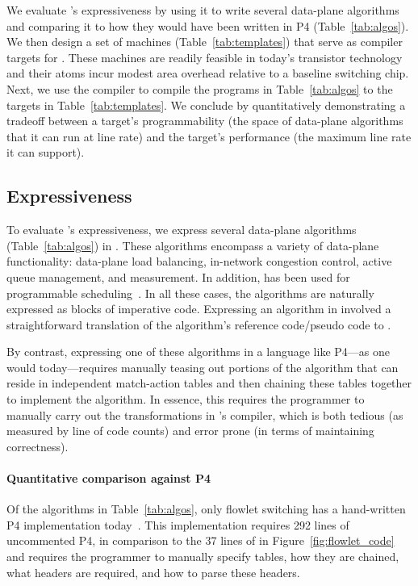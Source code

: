 We evaluate \pktlanguage's expressiveness by using it to write several
data-plane algorithms and comparing it to how they would have been written in
P4 (Table~\ref{tab:algos}). We then design a set of \absmachine machines
(Table~\ref{tab:templates}) that serve as compiler targets for \pktlanguage.
These machines are readily feasible in today's transistor technology and their
atoms incur modest area overhead relative to a baseline switching chip. Next,
we use the \pktlanguage compiler to compile the programs in
Table~\ref{tab:algos} to the targets in Table~\ref{tab:templates}.  We conclude
by quantitatively demonstrating a tradeoff between a target's programmability
(the space of data-plane algorithms that it can run at line rate) and the
target's performance (the maximum line rate it can support).

\subsection{Expressiveness}
\label{ss:Expressiveness}

To evaluate \pktlanguage's expressiveness, we express several data-plane
algorithms (Table~\ref{tab:algos}) in \pktlanguage. These algorithms encompass
a variety of data-plane functionality: data-plane load balancing, in-network
congestion control, active queue management, and measurement. In addition,
\pktlanguage has been used for programmable scheduling~\cite{prog_sched_arxiv}.
In all these cases, the algorithms are naturally expressed as blocks of
imperative code. Expressing an algorithm in \pktlanguage involved a
straightforward translation of the algorithm's reference code/pseudo code to
\pktlanguage.

By contrast, expressing one of these algorithms in a language like P4---as one
would today---requires manually teasing out portions of the algorithm that can
reside in independent match-action tables and then chaining these tables
together to implement the algorithm. In essence, this requires the programmer
to manually carry out the transformations in \pktlanguage's compiler, which is
both tedious (as measured by line of code counts) and error prone (in terms of
maintaining correctness).

\paragraph{Quantitative comparison against P4} Of the algorithms in
Table~\ref{tab:algos}, only flowlet switching has a hand-written P4
implementation today~\cite{p4_flowlet}. This implementation requires 292 lines
of uncommented P4, in comparison to the 37 lines of \pktlanguage in
Figure~\ref{fig:flowlet_code} and requires the programmer to manually specify
tables, how they are chained, what headers are required, and how to parse these
headers.

